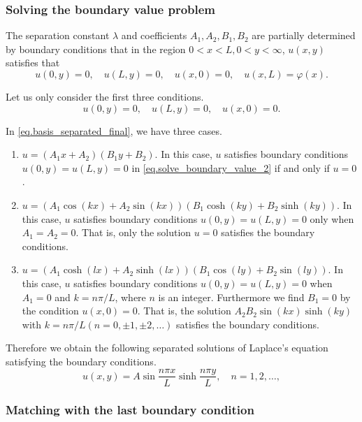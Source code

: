 \subsubsection{Solving the boundary value problem}
The separation constant $\lambda$ and coefficients $A_1, A_2, B_1, B_2$ are partially determined by boundary conditions that in the region $0<x<L, 0<y<\infty$, $u(x, y)$ satisfies that
\begin{equation}\label{eq.solve_boundary_value_1}
u(0, y)=0, \quad u(L, y)=0, \quad u(x, 0)=0, \quad u(x, L)=\varphi(x).
\end{equation}

Let us only consider the first three conditions.
\begin{equation}\label{eq.solve_boundary_value_2}
u(0, y)=0, \quad u(L, y)=0, \quad u(x, 0)=0.
\end{equation}

In \eqref{eq.basis_separated_final}, we have three cases.

\begin{enumerate}
    \item $u=\left(A_1 x+A_2\right)\left(B_1 y+B_2\right)$. In this case, $u$ satisfies boundary conditions $u(0, y)=u(L, y)=0$ in \eqref{eq.solve_boundary_value_2} if and only if $u = 0$.
    \item $u = \left(A_1 \cos (k x)+A_2 \sin (k x)\right)\left(B_1 \cosh (k y)+B_2 \sinh (k y)\right)$. In this case, $u$ satisfies boundary conditions $u(0, y)=u(L, y)=0$ only when $A_1=A_2=0$. That is, only the solution $u=0$ satisfies the boundary conditions.
    \item $u = \left(A_1 \cosh (l x)+A_2 \sinh (l x)\right)\left(B_1 \cos (l y)+B_2 \sin (l y)\right)$. In this case, $u$ satisfies boundary conditions $u(0, y)=u(L, y)=0$ when $A_1=0$ and $k=n \pi / L$, where $n$ is an integer. Furthermore we find $B_1=0$ by the condition $u(x, 0)=0$. That is, the solution $A_2 B_2 \sin (k x) \sinh (k y)$ with $k=n \pi / L(n=0, \pm 1, \pm 2, \ldots)$ satisfies the boundary conditions.
\end{enumerate}

Therefore we obtain the following separated solutions of Laplace's equation satisfying the boundary conditions.
\begin{equation}
u(x, y)=A \sin \frac{n \pi x}{L} \sinh \frac{n \pi y}{L}, \quad n=1,2, \ldots,
\end{equation}

\subsubsection{Matching with the last boundary condition}\label{sec.match_boundary}

